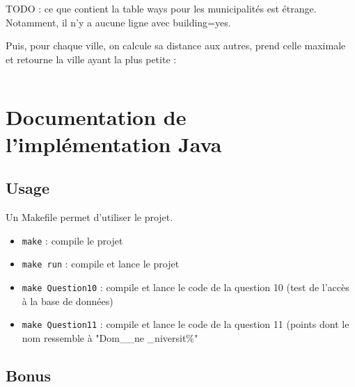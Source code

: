 \documentclass[12pt,a4paper]{article}
\begin{document}
TODO : ce que contient la table ways pour les municipalités est étrange. Notamment,
il n'y a aucune ligne avec building=yes.

Puis, pour chaque ville, on calcule sa distance aux autres, prend celle maximale
et retourne la ville ayant la plus petite :

\begin{lstlisting}[language=SQL]
\end{lstlisting}

\vspace{1cm}




\vspace{1cm}
\section*{Documentation de l'implémentation Java}

\subsection*{Usage}

Un Makefile permet d'utiliser le projet. 
\begin{itemize}
	\item \verb?make? : compile le projet
    \item \verb?make run? : compile et lance le projet
    \item \verb?make Question10? : compile et lance le code de la question 10 (test de l'accès à la base de données)
    \item \verb?make Question11? : compile et lance le code de la question 11 (points dont le nom ressemble à "Dom\_\_ne \_niversit\%"
\end{itemize}

\subsection{Bonus}
\end{document}
